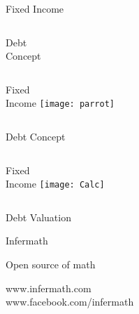 \documentclass[20pt,xcolor={dvipsnames}]{beamer}
\begin{document}
\begin{frame}

\vspace{-1cm}
\hspace{-0.5cm}
\Huge Fixed Income

\vspace{1cm}

\begin{columns}

Debt  \\ Concept


\end{columns}

\end{frame}

\begin{frame}

\centering
\Huge 

\begin{columns}
Fixed  \\ Income
\texttt{[image: parrot]} 
\end{columns}

\vspace{0.25cm}

Debt Concept

\end{frame}

\begin{frame}

\centering
\Huge 

\begin{columns}
Fixed  \\ Income
\texttt{[image: Calc]} 
\end{columns}

\vspace{0.25cm}

Debt Valuation

\end{frame}


\begin{frame}[c]

\centering


\vspace{-1cm}

\Huge Infermath 

\normalsize Open source of math 

\vspace{1cm}

\large www.infermath.com \\
www.facebook.com/infermath 

\end{frame}
\end{document}
